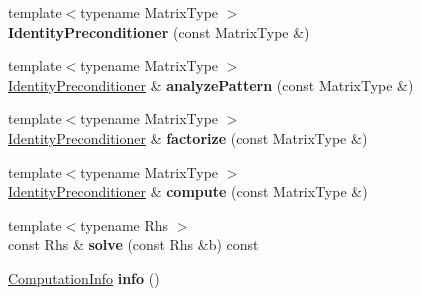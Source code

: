 \begin{DoxyCompactItemize}
\item 
\mbox{\label{class_eigen_1_1_identity_preconditioner_a5fb381c622f38f3b8deb0775867cdf5f}} 
{\footnotesize template$<$typename Matrix\+Type $>$ }\\{\bfseries Identity\+Preconditioner} (const Matrix\+Type \&)
\item 
\mbox{\label{class_eigen_1_1_identity_preconditioner_a87036e0a457777e2c3df4c103b4f8233}} 
{\footnotesize template$<$typename Matrix\+Type $>$ }\\\mbox{\hyperlink{class_eigen_1_1_identity_preconditioner}{Identity\+Preconditioner}} \& {\bfseries analyze\+Pattern} (const Matrix\+Type \&)
\item 
\mbox{\label{class_eigen_1_1_identity_preconditioner_a0d0c662f8811acabd6b69cfda901965f}} 
{\footnotesize template$<$typename Matrix\+Type $>$ }\\\mbox{\hyperlink{class_eigen_1_1_identity_preconditioner}{Identity\+Preconditioner}} \& {\bfseries factorize} (const Matrix\+Type \&)
\item 
\mbox{\label{class_eigen_1_1_identity_preconditioner_af3c2afdd74084ffa2ae9174df0316695}} 
{\footnotesize template$<$typename Matrix\+Type $>$ }\\\mbox{\hyperlink{class_eigen_1_1_identity_preconditioner}{Identity\+Preconditioner}} \& {\bfseries compute} (const Matrix\+Type \&)
\item 
\mbox{\label{class_eigen_1_1_identity_preconditioner_ade0afcd74021b444a488327d6dd0a07f}} 
{\footnotesize template$<$typename Rhs $>$ }\\const Rhs \& {\bfseries solve} (const Rhs \&b) const
\item 
\mbox{\label{class_eigen_1_1_identity_preconditioner_a450681df926cb312fc71a324e150340c}} 
\mbox{\hyperlink{group__enums_ga85fad7b87587764e5cf6b513a9e0ee5e}{Computation\+Info}} {\bfseries info} ()
\end{DoxyCompactItemize}


